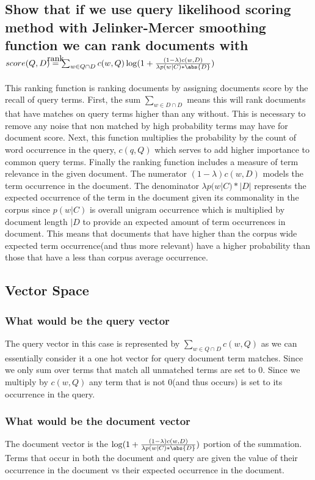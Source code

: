 \documentclass[11pt]{article}
\newcommand\myeq{\stackrel{\mathclap{\normalfont\mbox{rank}}}{=}}
\begin{document}
\subsection{Show that if we use query likelihood scoring method with Jelinker-Mercer smoothing function we can rank documents with \\$score(Q,D) \myeq \sum_{w \in Q \cap D} c(w,Q)\log(1 + \frac{(1-\lambda)c(w,D)}{\lambda p (w| C)*\abs{D}})$}
This ranking function is ranking documents by assigning documents score by the recall of query terms. First, the sum $\sum_{w \in D \cap D}$ means this will rank documents that have matches on query terms higher than any without. This is necessary to remove any noise that non matched by high probability terms may have for document score. Next, this function multiplies the probability by the count of word occurrence in the query, $c(q,Q)$ which serves to add higher importance to common query terms. Finally the ranking function includes a measure of term relevance in the given document. The numerator $(1-\lambda)c(w,D)$ models the term occurrence in the document. The denominator $\lambda p(w|C)*|D|$ represents the expected occurrence of the term in the document given its commonality in the corpus since $p(w|C)$ is overall unigram occurrence which is multiplied by document length $|D$ to provide an expected amount of term occurrences in document. This means that documents that have higher than the corpus wide expected term occurrence(and thus more relevant) have a higher probability than those that have a less than corpus average occurrence. 
\subsection{Vector Space}
\subsubsection{What would be the query vector}
The query vector in this case is represented by $\sum_{w \in Q \cap D} c(w,Q)$ as we can essentially consider it a one hot vector for query document term matches. Since we only sum over terms that match all unmatched terms are set to 0. Since we multiply by $c(w,Q)$ any term that is not 0(and thus occurs) is set to its occurrence in the query.
\subsubsection{What would be the document vector}
The document vector is the $\log(1 + \frac{(1-\lambda)c(w,D)}{\lambda p (w| C)*\abs{D}})$ portion of the summation. Terms that occur in both the document and query are given the value of their occurrence in the document vs their expected occurrence in the document. 
\end{document}
